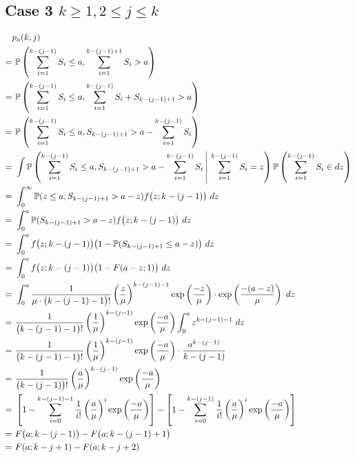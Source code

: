 \subsection{Case 3 $k \geq 1, 2 \leq j \leq k$}
\begin{align*}
	& p_{a} (k, j) \\
	= & \ \mathbb{P} \left( \sum_{i = 1}^{k - (j - 1)} S_{i} \leq a, \sum_{i = 1}^{k - (j - 1) + 1} S_{i} > a \right) \\
	= & \ \mathbb{P} \left( \sum_{i = 1}^{k - (j - 1)} S_{i} \leq a, \sum_{i = 1}^{k - (j - 1)} S_{i} + S_{k - (j - 1) + 1} > a \right) \\
	= & \ \mathbb{P} \left( \sum_{i = 1}^{k - (j - 1)} S_{i} \leq a, S_{k - (j - 1) + 1} > a - \sum_{i = 1}^{k - (j - 1)} S_{i} \right) \\
	= & \ \int \mathbb{P} \left( \sum_{i = 1}^{k - (j - 1)} S_{i} \leq a, S_{k - (j - 1) + 1} > a - \sum_{i = 1}^{k - (j -1)} S_{i} \ \vline \ \sum_{i = 1}^{k - (j - 1)} S_{i} = z \right) \mathbb{P} \left( \sum_{i = 1}^{k - (j - 1)} S_{i} \in d z \right) \\
	= & \ \int_{0}^{\infty} \mathbb{P} (z \leq a, S_{k - (j - 1) + 1} > a - z) f \big( z; k - (j - 1) \big) \ d z \\
	= & \ \int_{0}^{a} \mathbb{P} (S_{k - (j - 1) + 1} > a - z) f \big( z; k - (j - 1) \big) \ d z \\
	= & \ \int_{0}^{a} f \big( z; k - (j - 1) \big) \big( 1 - \mathbb{P} (S_{k - (j - 1) + 1} \leq a - z) \big) \ d z \\
	= & \ \int_{0}^{a} f \big( z; k - (j - 1) \big) \big( 1 - F (a - z; 1) \big) \ d z \\
	= & \ \int_{0}^{a} \frac{1}{\mu \cdot \big( k - (j - 1) - 1 \big)!} \left( \frac{z}{\mu} \right)^{k - (j - 1) - 1} \exp \left( \frac{-z}{\mu} \right) \cdot \exp \left( \frac{- (a - z)}{\mu} \right) \ d z \\
	= & \ \frac{1}{\big( k - (j - 1) - 1 \big)!} \left( \frac{1}{\mu} \right)^{k - (j - 1)} \exp \left( \frac{- a}{\mu} \right) \int_{0}^{a} z^{k - (j - 1) - 1} \ d z \\
	= & \ \frac{1}{\big( k - (j - 1) - 1 \big)!} \left( \frac{1}{\mu} \right)^{k - (j - 1)} \exp \left( \frac{- a}{\mu} \right) \cdot \frac{a^{k - (j - 1)}}{k - (j - 1)} \\
	= & \ \frac{1}{\big( k - (j - 1) \big)!} \left( \frac{a}{\mu} \right)^{k - (j - 1)} \exp \left( \frac{- a}{\mu} \right) \\
	= & \ \left[ 1 - \sum_{i = 0}^{k - (j - 1) - 1} \frac{1}{i!} \left( \frac{a}{\mu} \right)^{i} \exp \left( \frac{- a}{\mu} \right) \right] - \left[ 1 - \sum_{i = 0}^{k - (j - 1)} \frac{1}{i!} \left( \frac{a}{\mu} \right)^{i} \exp \left( \frac{- a}{\mu} \right) \right] \\
	= & \ F \big( a; k - (j - 1) \big) - F \big( a; k - (j - 1) + 1 \big) \\
	= & \ F (a; k - j + 1) - F (a; k - j + 2)
\end{align*}

